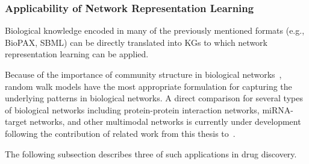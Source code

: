 \subsubsection{Applicability of Network Representation Learning}

Biological knowledge encoded in many of the previously mentioned formats (e.g., \ac{BioPAX}, \ac{SBML}) can be directly translated into \acp{KG} to which network representation learning can be applied.

Because of the importance of community structure in biological networks~\cite{Girvan2002}, random walk models have the most appropriate formulation for capturing the underlying patterns in biological networks.
A direct comparison for several types of biological networks including protein-protein interaction networks, miRNA-target networks, and other multimodal networks is currently under development following the contribution of related work from this thesis to~\cite{Ali2019}.

The following subsection describes three of such applications in drug discovery.
